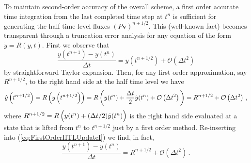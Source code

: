 \documentclass{ametsoc}
\theoremstyle{definition}
\newcommand{\eq}[1]{(\ref{#1})}
\newcommand{\vect}[1]{{\mathbf{#1}}}
\newcommand{\vv}{\vect{v}}
\newcommand{\half}{1/2}
\newcommand{\dt}{\Delta t}
\newcommand{\bigoh}[1]{\mathcal{O}\left(#1\right)}
\begin{document}
To maintain second-order accuracy of the overall scheme, a first order accurate 
time integration from the last completed time step at $t^n$ is sufficient for 
generating the half time level fluxes $(P\vv)^{n+\half}$. This (well-known fact)  becomes transparent through a truncation error analysis for any equation of 
the form $\dot y = R(y,t)$. First we observe that
%
\begin{equation}\label{eq:FirstOrderHTLUpdateI}
\frac{y(t^{n+1})-y(t^n)}{\dt} = \dot y\left(t^{n+\half}\right) + \bigoh{\dt^2}
\end{equation}
%
by straightforward Taylor expansion. Then, for any first-order approximation, 
say $R^{n+\half}$, to the right hand side at the half time level we have  
%
\begin{equation}\label{eq:FirstOrderHTLUpdateII}
\dot y\left(t^{n+\half}\right) 
= R\left(y\left(t^{n+\half}\right)\right) 
= R\left(y(t^n) + \frac{\Delta t}{2} \dot y(t^n) + \bigoh{\Delta t^2}\rule{0pt}{12pt}\right)
= R^{n+\half} + \bigoh{\dt^2}\,,
\end{equation}
%
where $R^{n+\half} = R\left(y(t^n) + (\Delta t/2) \dot y(t^n)\rule{0pt}{10pt}\right)$ is the right hand side evaluated at a state that is lifted from $t^n$ to $t^{n+\half}$ just by a first order method. Re-inserting into \eq{eq:FirstOrderHTLUpdateI} we find, in fact,
%
\begin{equation}
\frac{y(t^{n+1})-y(t^n)}{\dt} = R^{n+\half} + \bigoh{\dt^2}\, .
\end{equation}
%
\end{document}
